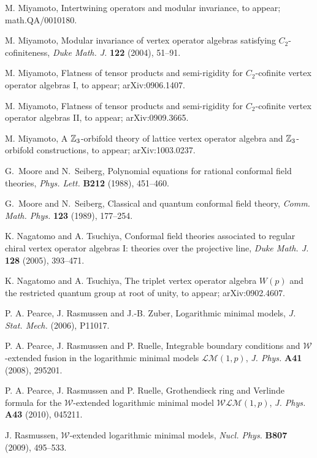 \documentclass[12pt]{article}
\begin{document}
\begin{thebibliography}{FGST2}
M. Miyamoto, Intertwining operators and modular invariance,
to appear; math.QA/0010180.

M. Miyamoto, Modular invariance of vertex operator
algebras satisfying $C_{2}$-cofiniteness,
{\it Duke Math. J.} {\bf 122}  (2004),  51--91.

M. Miyamoto, Flatness of tensor products and semi-rigidity for 
$C_2$-cofinite vertex operator algebras I,
to appear; arXiv:0906.1407.

M. Miyamoto, Flatness of tensor products and semi-rigidity for 
$C_2$-cofinite vertex operator algebras II,
to appear; arXiv:0909.3665.

M. Miyamoto, A $\mathbb{Z}_3$-orbifold theory of lattice vertex operator 
algebra and $\mathbb{Z}_3$-orbifold constructions,
to appear; arXiv:1003.0237.

G.~Moore and N.~Seiberg,
Polynomial equations for rational conformal field theories,
{\em Phys. Lett.} {\bf B212} (1988), 451--460.

G.~Moore and N.~Seiberg,
Classical and quantum conformal field theory,
{\em Comm. Math. Phys.} {\bf 123} (1989), 177--254.

K. Nagatomo and A. Tsuchiya, Conformal field theories associated to
regular chiral vertex operator algebras I: theories over the
projective line, {\em Duke Math. J.} {\bf 128} (2005), 393--471.

K. Nagatomo and A. Tsuchiya, The triplet vertex operator algebra $W(p)$ and the
restricted quantum group at root of unity, to appear; arXiv:0902.4607. 

P. A. Pearce, J. Rasmussen and J.-B. Zuber, Logarithmic minimal models, 
{\it J. Stat. Mech.} (2006), P11017.

P. A. Pearce, J. Rasmussen and P. Ruelle, Integrable boundary conditions and 
$\mathcal{W}$-extended fusion in
the logarithmic minimal models $\mathcal{LM}(1, p)$, 
{\it J. Phys.} {\bf A41} (2008), 295201.

P. A. Pearce, J. Rasmussen and P. Ruelle,
Grothendieck ring and Verlinde formula for the 
$\mathcal{W}$-extended logarithmic minimal model $\mathcal{WLM}(1,p)$,
{\it J. Phys.} {\bf A43} (2010), 045211.

J. Rasmussen, $\mathcal{W}$-extended logarithmic minimal models, 
{\it Nucl. Phys.} {\bf B807} (2009), 495--533.


\end{thebibliography}
\end{document}

